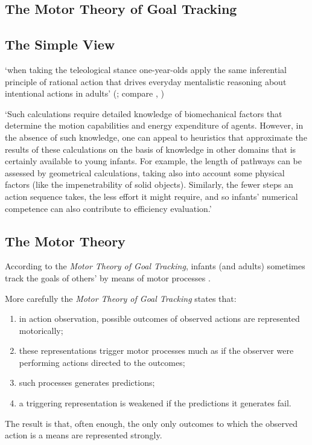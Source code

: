 \documentclass[12pt]{extarticle}
\begin{document}
\begin{multicols*}{3}
 

 
\section{The Motor Theory of Goal Tracking}
 

\subsection{The Simple View}
‘when taking the teleological stance one-year-olds apply the same
inferential principle of rational action that drives everyday mentalistic
reasoning about intentional actions in adults’
(\citealp{Gergely:2003gb}; compare \citealp{Csibra:2003jv}, \citealp[p.~259]{Csibra:1998cx} )

‘Such calculations require detailed knowledge of biomechanical factors that 
determine the motion capabilities and energy expenditure of agents. However, 
in the absence of such knowledge, one can appeal to heuristics that approximate 
the results of these calculations on the basis of knowledge in other domains 
that is certainly available to young infants. For example, the length of 
pathways can be assessed by geometrical calculations, taking also into 
account some physical factors (like the impenetrability of solid objects). 
Similarly, the fewer steps an action sequence takes, the less effort it might 
require, and so infants’ numerical competence can also contribute to efficiency 
evaluation.’ \citep{csibra:2013_teleological}
 
\subsection{The Motor Theory}

According to the \emph{Motor Theory of Goal Tracking}, infants (and adults) sometimes track the
goals of others’ by means of motor processes \citep[see][for details]{sinigaglia:2015_puzzle}.
 
More carefully  the \emph{Motor Theory of Goal Tracking} states that: 
\begin{enumerate}
\item in action observation, possible outcomes of observed actions are represented motorically;
\item these representations trigger motor processes much as if the observer were performing actions directed to the outcomes;
\item such processes generates predictions;
\item a triggering representation is weakened if the predictions it generates fail.
\end{enumerate}
The result is that, often enough, the only only outcomes to which the observed action is a means
are represented strongly.
 

\end{multicols*}
\end{document}
